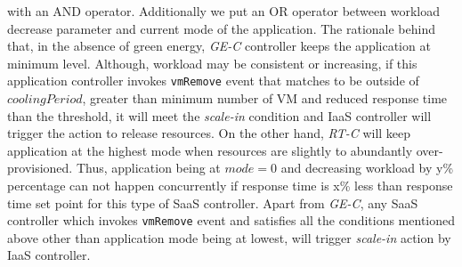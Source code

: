 with an AND operator. Additionally we put an OR operator between workload decrease parameter and current mode of the application. The rationale behind that, in the absence of green energy, \emph{GE-C} controller keeps the application at minimum level. Although, workload may be consistent or increasing, if this application controller invokes \texttt{vmRemove} event that matches to be outside of $coolingPeriod$, greater than minimum number of VM and reduced response time than the threshold, it will meet the \emph{scale-in} condition and IaaS controller will trigger the action to release resources. On the other hand, \emph{RT-C} will keep application at the highest mode when resources are slightly to abundantly over-provisioned. Thus, application being at $mode=0$ and decreasing workload by y\% percentage can not happen concurrently if response time is x\% less than response time set point for this type of SaaS controller. Apart from \emph{GE-C}, any SaaS controller which invokes \texttt{vmRemove} event and satisfies all the conditions mentioned above other than application mode being at lowest, will trigger \emph{scale-in} action by IaaS controller.




